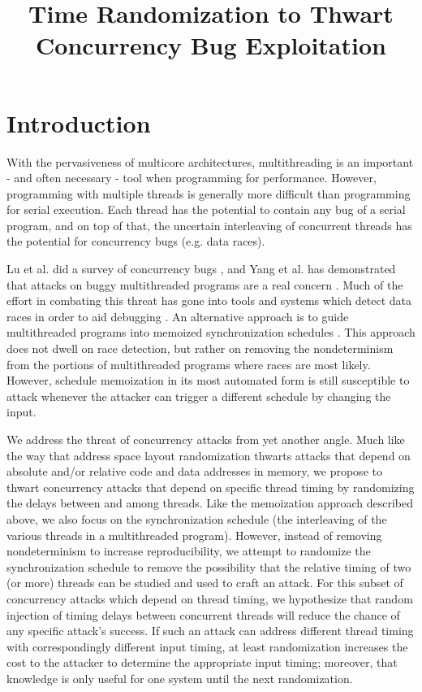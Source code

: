\documentclass[12pt,conference]{IEEEtran}
\begin{document}
\title{Time Randomization to Thwart Concurrency Bug Exploitation}
\author{
}
\maketitle

\section{Introduction}
With the pervasiveness of multicore architectures, multithreading is an important - and often necessary - tool when programming for performance.  However, programming with multiple threads is generally more difficult than programming for serial execution.  Each thread has the potential to contain any bug of a serial program, and on top of that, the uncertain interleaving of concurrent threads has the potential for concurrency bugs (e.g. data races).

Lu et al. did a survey of concurrency bugs \cite{Lu2008}, and Yang et al. has demonstrated that attacks on buggy multithreaded programs are a real concern \cite{Yang2011}.  Much of the effort in combating this threat has gone into tools and systems which detect data races in order to aid debugging \cite{Savage1997, Flanagan2004, Laadan2011, Pratikakis2011, Kasikci2013}.  An alternative approach is to guide multithreaded programs into memoized synchronization schedules \cite{Cui2011}.  This approach does not dwell on race detection, but rather on removing the nondeterminism from the portions of multithreaded programs where races are most likely.  However, schedule memoization in its most automated form is still susceptible to attack whenever the attacker can trigger a different schedule by changing the input.

We address the threat of concurrency attacks from yet another angle.  Much like the way that address space layout randomization thwarts attacks that depend on absolute and/or relative code and data addresses in memory, we propose to thwart concurrency attacks that depend on specific thread timing by randomizing the delays between and among threads.  Like the memoization approach described above, we also focus on the synchronization schedule (the interleaving of the various threads in a multithreaded program).  However, instead of removing nondeterminism to increase reproducibility, we attempt to randomize the synchronization schedule to remove the possibility that the relative timing of two (or more) threads can be studied and used to craft an attack.  For this subset of concurrency attacks which depend on thread timing, we hypothesize that random injection of timing delays between concurrent threads will reduce the chance of any specific attack's success.  If such an attack can address different thread timing with correspondingly different input timing, at least randomization increases the cost to the attacker to determine the appropriate input timing; moreover, that knowledge is only useful for one system until the next randomization. 
\end{document}
